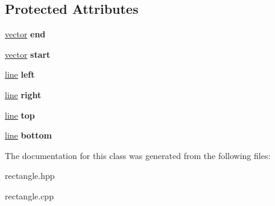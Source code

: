 \subsection*{Protected Attributes}
\begin{DoxyCompactItemize}
\item 
\mbox{\label{classrectangle_aee701f2f5c4d8dc8780ba9fac0693ac7}} 
\hyperlink{classvector}{vector} {\bfseries end}
\item 
\mbox{\label{classrectangle_a21aafb055b61a9b26b03a309a80b49c9}} 
\hyperlink{classvector}{vector} {\bfseries start}
\item 
\mbox{\label{classrectangle_a76aa7276edfddfac8278d8d614686616}} 
\hyperlink{classline}{line} {\bfseries left}
\item 
\mbox{\label{classrectangle_a42d651a2358b3f91c47db91f7cd8878a}} 
\hyperlink{classline}{line} {\bfseries right}
\item 
\mbox{\label{classrectangle_a91b67581c0120705272c701cdc4bb716}} 
\hyperlink{classline}{line} {\bfseries top}
\item 
\mbox{\label{classrectangle_a356858f50aa3f38731f62bc7aa57dfad}} 
\hyperlink{classline}{line} {\bfseries bottom}
\end{DoxyCompactItemize}


The documentation for this class was generated from the following files\+:\begin{DoxyCompactItemize}
\item 
rectangle.\+hpp\item 
rectangle.\+cpp\end{DoxyCompactItemize}
